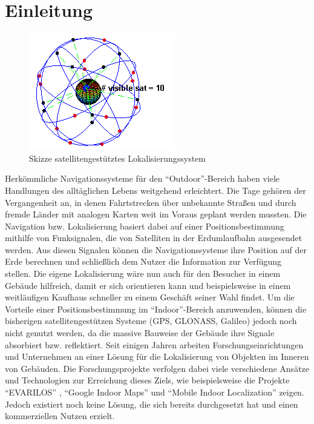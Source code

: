 \chapter{Einleitung}
\begin{figure}
\centering
\includegraphics[scale=0.8]{Bilder/GPS.png} 
\caption{Skizze satellitengestütztes Lokalisierungssystem \cite{GPS}}
\label{GPS}
\end{figure}
Herkömmliche Navigationssysteme für den "`Outdoor"'-Bereich haben viele Handlungen des alltäglichen Lebens weitgehend erleichtert. Die Tage gehören der Vergangenheit an, in denen Fahrtstrecken über unbekannte Straßen und durch fremde Länder mit analogen Karten weit im Voraus geplant werden mussten. Die Navigation bzw. Lokalisierung basiert dabei auf einer Positionsbestimmung mithilfe von Funksignalen, die von Satelliten in der Erdumlaufbahn ausgesendet werden. Aus diesen Signalen können die Navigationssysteme ihre Position auf der Erde berechnen und schließlich dem Nutzer die Information zur Verfügung stellen. Die eigene Lokalisierung wäre nun auch für den Besucher in einem Gebäude hilfreich, damit er sich orientieren kann und beispielsweise in einem weitläufigen Kaufhaus schneller zu einem Geschäft seiner Wahl findet. Um die Vorteile einer Positionsbestimmung im "`Indoor"'-Bereich anzuwenden, können die bisherigen satellitengestützen Systeme (GPS, GLONASS, Galileo) jedoch noch nicht genutzt werden, da die massive Bauweise der Gebäude ihre Signale absorbiert bzw. reflektiert. Seit einigen Jahren arbeiten Forschungseinrichtungen und Unternehmen an einer Lösung für die Lokalisierung von Objekten im Inneren von Gebäuden. Die Forschungsprojekte verfolgen dabei viele verschiedene Ansätze und Technologien zur Erreichung dieses Ziels, wie beispielsweise die Projekte "`EVARILOS"' \cite{EVA}, "`Google Indoor Maps"' \cite{GIM} und "`Mobile Indoor Localization"' \cite{MIL} zeigen. Jedoch existiert noch keine Lösung, die sich bereits durchgesetzt hat und einen kommerziellen Nutzen erzielt.\\ \\

